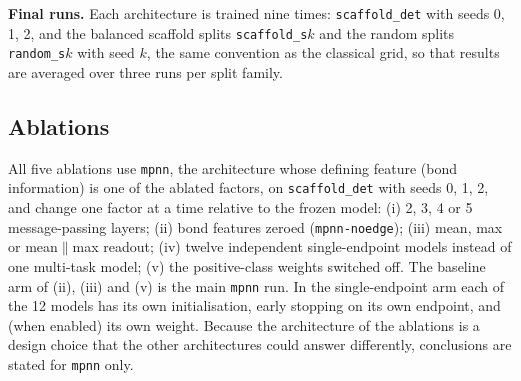 \textbf{Final runs.} Each architecture is trained nine times: \texttt{scaffold\_det} with seeds 0, 1, 2, and the balanced scaffold splits \texttt{scaffold\_s}$k$ and the random splits \texttt{random\_s}$k$ with seed $k$, the same convention as the classical grid, so that results are averaged over three runs per split family.

\subsection{Ablations}
All five ablations use \texttt{mpnn}, the architecture whose defining feature (bond information) is one of the ablated factors, on \texttt{scaffold\_det} with seeds 0, 1, 2, and change one factor at a time relative to the frozen model: (i) 2, 3, 4 or 5 message-passing layers; (ii) bond features zeroed (\texttt{mpnn-noedge}); (iii) mean, max or mean$\|$max readout; (iv) twelve independent single-endpoint models instead of one multi-task model; (v) the positive-class weights switched off. The baseline arm of (ii), (iii) and (v) is the main \texttt{mpnn} run. In the single-endpoint arm each of the 12 models has its own initialisation, early stopping on its own endpoint, and (when enabled) its own weight. Because the architecture of the ablations is a design choice that the other architectures could answer differently, conclusions are stated for \texttt{mpnn} only.
